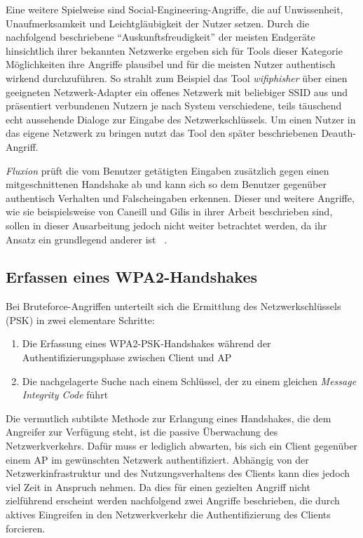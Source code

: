 Eine weitere Spielweise sind Social-Engineering-Angriffe, die auf Unwissenheit, Unaufmerksamkeit und Leichtgläubigkeit der Nutzer setzen. 
Durch die nachfolgend beschriebene \enquote{Auskunftsfreudigkeit} der meisten Endgeräte hinsichtlich ihrer bekannten Netzwerke ergeben sich für Tools dieser Kategorie Möglichkeiten ihre Angriffe plausibel und für die meisten Nutzer authentisch wirkend durchzuführen.
So strahlt zum Beispiel das Tool \textit{wifiphisher} über einen geeigneten Netzwerk-Adapter ein offenes Netzwerk mit beliebiger SSID aus und präsentiert verbundenen Nutzern je nach System verschiedene, teils täuschend echt aussehende Dialoge zur Eingabe des Netzwerkschlüssels. 
Um einen Nutzer in das eigene Netzwerk zu bringen nutzt das Tool den später beschriebenen Deauth-Angriff. 

\textit{Fluxion} prüft die vom Benutzer getätigten Eingaben zusätzlich gegen einen mitgeschnittenen Handshake ab und kann sich so dem Benutzer gegenüber authentisch Verhalten und Falscheingaben erkennen. 
Dieser und weitere Angriffe, wie sie beispielsweise von Caneill und Gilis in ihrer Arbeit beschrieben sind, sollen in dieser Ausarbeitung jedoch nicht weiter betrachtet werden, da ihr Ansatz ein grundlegend anderer ist ~\cite{caneill2010attacks}.\\

\subsection{Erfassen eines WPA2-Handshakes}
Bei Bruteforce-Angriffen unterteilt sich die Ermittlung des Netzwerkschlüssels (PSK) in zwei elementare Schritte: 
\begin{enumerate}
	\item Die Erfassung eines WPA2-PSK-Handshakes während der Authentifizierungsphase zwischen Client und AP
	\item Die nachgelagerte Suche nach einem Schlüssel, der zu einem gleichen \textit{Message Integrity Code} führt
\end{enumerate}
Die vermutlich subtilste Methode zur Erlangung eines Handshakes, die dem Angreifer zur Verfügung steht, ist die passive Überwachung des Netzwerkverkehrs.
Dafür muss er lediglich abwarten, bis sich ein Client gegenüber einem AP im gewünschten Netzwerk authentifiziert. 
Abhängig von der Netzwerkinfrastruktur und des Nutzungsverhaltens des Clients kann dies jedoch viel Zeit in Anspruch nehmen.
Da dies für einen gezielten Angriff nicht zielführend erscheint werden nachfolgend zwei Angriffe beschrieben, die durch aktives Eingreifen in den Netzwerkverkehr die Authentifizierung des Clients forcieren.

